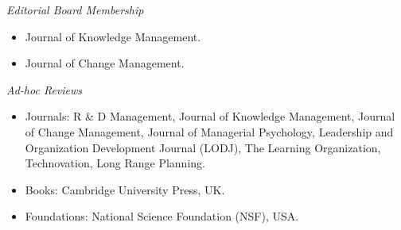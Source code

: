 \textit{Editorial Board Membership}
 
\begin{itemize}
\item Journal of Knowledge Management.
\item Journal of Change Management. 
\end{itemize}


\textit{Ad-hoc Reviews}

\begin{itemize}
\item Journals: R \& D Management, Journal of Knowledge Management, Journal of Change Management, Journal of Managerial Psychology, Leadership and Organization Development Journal (LODJ), The Learning Organization, Technovation, Long Range Planning. 
\item Books: Cambridge University Press, UK.
\item Foundations: National Science Foundation (NSF), USA.
\end{itemize}





